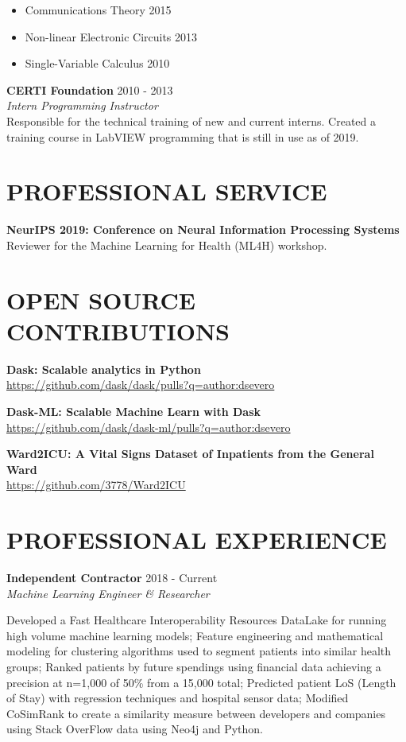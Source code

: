 \documentclass[margin, line]{res}
\begin{document}
\begin{resume}
\begin{itemize}
    \item Communications Theory \hfill 2015
    \item Non-linear Electronic Circuits \hfill 2013
    \item Single-Variable Calculus \hfill 2010
\end{itemize}

\textbf{CERTI Foundation} \hfill 2010 - 2013\\
{\sl Intern Programming Instructor}\\
Responsible for the technical training of new and current interns. Created a training course in LabVIEW programming that is still in use as of 2019.

\section{PROFESSIONAL SERVICE}
\textbf{NeurIPS 2019: Conference on Neural Information Processing Systems}\\
Reviewer for the Machine Learning for Health (ML4H) workshop.

\section{OPEN SOURCE CONTRIBUTIONS}
\textbf{Dask: Scalable analytics in Python}\\
\url{https://github.com/dask/dask/pulls?q=author:dsevero}

\textbf{Dask-ML: Scalable Machine Learn with Dask}\\
\url{https://github.com/dask/dask-ml/pulls?q=author:dsevero}

\textbf{Ward2ICU: A Vital Signs Dataset of Inpatients from the General Ward}\\
\url{https://github.com/3778/Ward2ICU}

\section{PROFESSIONAL EXPERIENCE}
\textbf{Independent Contractor} \hfill 2018 - Current\\
{\sl Machine Learning Engineer \& Researcher}\\
\begin{small}
    Developed a Fast Healthcare Interoperability Resources DataLake for running high volume machine learning models; Feature engineering and mathematical modeling for clustering algorithms used to segment patients into similar health groups; Ranked patients by future spendings using financial data achieving a precision at n=1,000 of 50\% from a 15,000 total; Predicted patient LoS (Length of Stay) with regression techniques and hospital sensor data; Modified CoSimRank to create a similarity measure between developers and companies using Stack OverFlow data using Neo4j and Python.
\end{small}


\end{resume}
\end{document}
